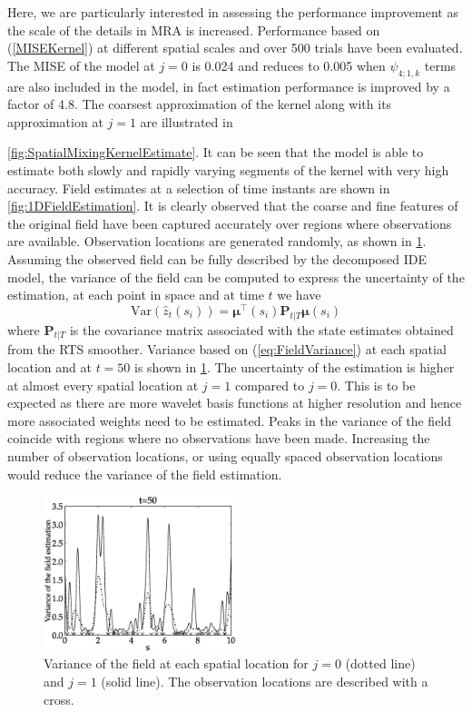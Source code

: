 \documentclass[11pt,draftcls,onecolumn,peerreview]{IEEEtran}
\begin{document}
  Here, we are particularly interested in assessing the performance improvement as the scale of the details in MRA is increased. Performance based on (\ref{MISEKernel}) at different spatial scales and over 500 trials have been evaluated. The MISE of the model at $j=0$ is 0.024 and reduces to 0.005 when $\psi_{4;1,k}$ terms are also included in the model, in fact estimation performance is improved by a factor of 4.8. The coarsest approximation of the kernel along with its approximation at $j=1$ are illustrated in \figurename{\ref{fig:SpatialMixingKernelEstimate}. It can be seen that the model is able to estimate both slowly and rapidly varying segments of the  kernel with very high accuracy.  Field estimates  at a selection of time instants are shown in \figurename{\ref{fig:1DFieldEstimation}}. It is clearly observed that the coarse and fine features of the original field have been captured accurately over regions where observations are available. Observation locations are generated randomly, as shown in \figurename{ \ref{fig:FieldVariance}}. Assuming the observed field can be fully described by the  decomposed IDE model, the variance of the field can be computed to express the  uncertainty of the estimation, at each point in space and at time $t$ we have 
\begin{equation}
 \text{Var}(\hat z_t(s_i))=\boldsymbol\mu^{\top}(s_i) \mathbf P_{t|T}\boldsymbol\mu(s_i)
\label{eq:FieldVariance}
\end{equation}
where $\mathbf P_{t|T} $ is the covariance matrix associated with the  state estimates obtained from the RTS smoother. Variance based on (\ref{eq:FieldVariance}) at each spatial location and at $t=50$ is shown in \figurename{\ref{fig:FieldVariance}}. The uncertainty of the estimation is higher at almost  every spatial location at $j=1$ compared to $j=0$. This is to be expected as there are more wavelet basis functions at higher resolution and hence more associated weights need to be estimated. Peaks in the variance of the field coincide with regions where no observations have been made. Increasing the number of observation locations, or using equally spaced observation locations would reduce the variance of the field estimation.
\begin{figure}[!h] 
\centering
\includegraphics[width=0.5\textwidth]{./Graph/aram4.eps}
\caption{Variance of the field at each spatial location for $j=0$ (dotted line) and $j=1$ (solid line). The observation locations are described with a cross.}
\label{fig:FieldVariance}
\end{figure} 
}
\end{document}
